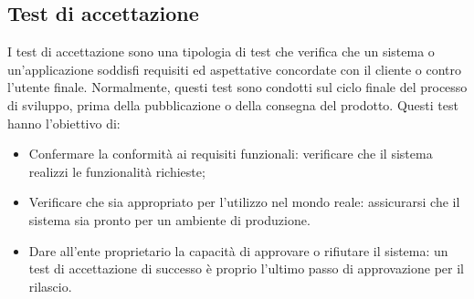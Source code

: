 \subsection{Test di accettazione}
I test di accettazione sono una tipologia di test che verifica che un sistema o un'applicazione soddisfi requisiti ed aspettative concordate con il cliente o contro l'utente finale. Normalmente, questi test sono condotti sul ciclo finale del processo di sviluppo, prima della pubblicazione o della consegna del prodotto. Questi test hanno l'obiettivo di:
\begin{itemize}
    \item Confermare la conformità ai requisiti funzionali: verificare che il sistema realizzi le funzionalità richieste;
    \item Verificare che sia appropriato per l'utilizzo nel mondo reale: assicurarsi che il sistema sia pronto per un ambiente di produzione.
    \item Dare all'ente proprietario la capacità di approvare o rifiutare il sistema: un test di accettazione di successo è proprio l'ultimo passo di approvazione per il rilascio.
\end{itemize}
